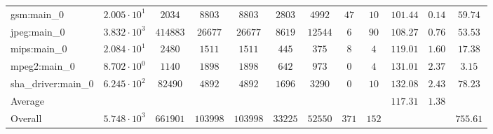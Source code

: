 \begin{tabular}{|l|c|c|c|c|c|c|c|c|c|c|c|}
gsm:main\_0             & $ 2.005 \cdot 10^{1}  $ & $ 2034   $ & $ 8803   $ & $ 8803   $ & $ 2803  $ & $ 4992  $ & $ 47  $ & $ 10  $ & $ 101.44      $ & $ 0.14    $ & $ 59.74   $ \\
jpeg:main\_0            & $ 3.832 \cdot 10^{3}  $ & $ 414883 $ & $ 26677  $ & $ 26677  $ & $ 8619  $ & $ 12544 $ & $ 6   $ & $ 90  $ & $ 108.27      $ & $ 0.76    $ & $ 53.53   $ \\
mips:main\_0            & $ 2.084 \cdot 10^{1}  $ & $ 2480   $ & $ 1511   $ & $ 1511   $ & $ 445   $ & $ 375   $ & $ 8   $ & $ 4   $ & $ 119.01      $ & $ 1.60    $ & $ 17.38   $ \\
mpeg2:main\_0           & $ 8.702 \cdot 10^{0}  $ & $ 1140   $ & $ 1898   $ & $ 1898   $ & $ 642   $ & $ 973   $ & $ 0   $ & $ 4   $ & $ 131.01      $ & $ 2.37    $ & $ 3.15    $ \\
sha\_driver:main\_0     & $ 6.245 \cdot 10^{2}  $ & $ 82490  $ & $ 4892   $ & $ 4892   $ & $ 1696  $ & $ 3290  $ & $ 0   $ & $ 10  $ & $ 132.08      $ & $ 2.43    $ & $ 78.23   $ \\
\hline
Average                 & $                     $ & $        $ & $        $ & $        $ & $       $ & $       $ & $     $ & $     $ & $ 117.31      $ & $ 1.38    $ & $         $ \\
\hline
Overall                 & $ 5.748 \cdot 10^{3}  $ & $ 661901 $ & $ 103998 $ & $ 103998 $ & $ 33225 $ & $ 52550 $ & $ 371 $ & $ 152 $ & $             $ & $         $ & $ 755.61  $ \\
\hline
\end{tabular}
